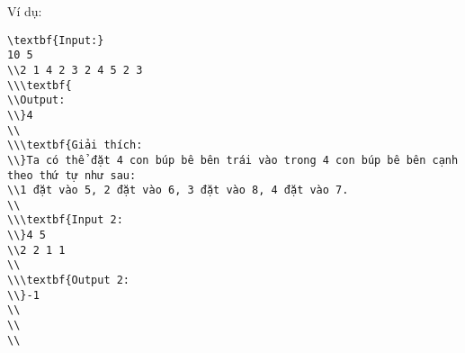 Ví dụ:
\begin{verbatim}
\textbf{Input:}
10 5
\\2 1 4 2 3 2 4 5 2 3
\\\textbf{
\\Output:
\\}4
\\
\\\textbf{Giải thích: 
\\}Ta có thể đặt 4 con búp bê bên trái vào trong 4 con búp bê bên cạnh theo thứ tự như sau: 
\\1 đặt vào 5, 2 đặt vào 6, 3 đặt vào 8, 4 đặt vào 7.
\\
\\\textbf{Input 2:
\\}4 5
\\2 2 1 1
\\
\\\textbf{Output 2:
\\}-1
\\
\\
\\\end{verbatim}